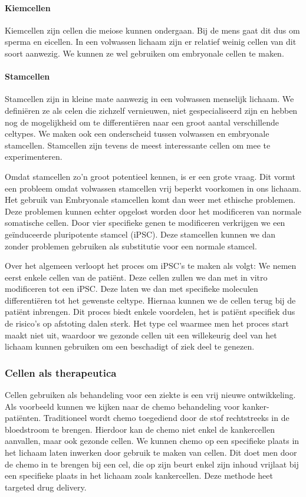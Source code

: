 \documentclass[a4paper,kul]{kulakarticle} %
\begin{document}
\paragraph{Kiemcellen}
Kiemcellen zijn cellen die meiose kunnen ondergaan. Bij de mens gaat dit dus om sperma en eicellen. In een volwassen lichaam zijn er relatief weinig cellen van dit soort aanwezig. We kunnen ze wel gebruiken om embryonale cellen te maken. 
\paragraph{Stamcellen}
Stamcellen zijn in kleine mate aanwezig in een volwassen menselijk lichaam. We definiëren ze als celen die zichzelf vernieuwen, niet gespecialiseerd zijn en hebben nog de mogelijkheid om te differentiëren naar een groot aantal verschillende celtypes. We maken ook een onderscheid tussen volwassen en embryonale stamcellen. Stamcellen zijn tevens de meest interessante cellen om mee te experimenteren.

Omdat stamcellen zo'n groot potentieel kennen, is er een grote vraag. Dit vormt een probleem omdat volwassen stamcellen vrij beperkt voorkomen in ons lichaam. Het gebruik van Embryonale stamcellen komt dan weer met ethische problemen. Deze problemen kunnen echter opgelost worden door het modificeren van normale somatische cellen. Door vier specifieke genen te modificeren verkrijgen we een geïnduceerde pluripotente stamcel (iPSC). Deze stamcellen kunnen we dan zonder problemen gebruiken als substitutie voor een normale stamcel.

Over het algemeen verloopt het proces om iPSC's te maken als volgt: We nemen eerst enkele cellen van de patiënt. Deze cellen zullen we dan met in vitro modificeren tot een iPSC. Deze laten we dan met specifieke moleculen differentiëren tot het gewenste celtype. Hiernaa kunnen we de cellen terug bij de patiënt inbrengen. Dit proces biedt enkele voordelen, het is patiënt specifiek dus de risico's op afstoting dalen sterk. Het type cel waarmee men het proces start maakt niet uit, waardoor we gezonde cellen uit een willekeurig deel van het lichaam kunnen gebruiken om een beschadigt of ziek deel te genezen. 
\subsubsection{Cellen als therapeutica}
Cellen gebruiken als behandeling voor een ziekte is een vrij nieuwe ontwikkeling. Als voorbeeld kunnen we kijken naar de chemo behandeling voor kanker-patiënten. Traditioneel wordt chemo toegediend door de stof rechtstreeks in de bloedstroom te brengen. Hierdoor kan de chemo niet enkel de kankercellen aanvallen, maar ook gezonde cellen. We kunnen chemo op een specifieke plaats in het lichaam laten inwerken door gebruik te maken van cellen. Dit doet men door de chemo in te brengen bij een cel, die op zijn beurt enkel zijn inhoud vrijlaat bij een specifieke plaats in het lichaam zoals kankercellen. Deze methode heet targeted drug delivery.
\end{document}
